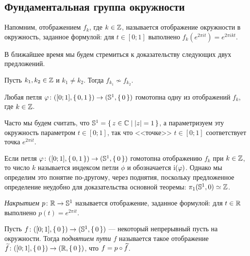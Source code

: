 \documentclass[main]{subfiles}
\begin{document}
\subsection{Фундаментальная группа окружности}

\begin{remark}
	Напомним, отображением $ f_k $, где $ k \in \mathbb{Z} $, называется отображение окружности в окружность, заданное
	формулой: для $ t \in [0; 1] $ выполнено $ f_k( e^{2 \pi i t}) = e^{2 \pi i k t} $.
\end{remark}

В ближайшее время мы будем стремиться к доказательству следующих двух предложений.

\begin{proposition*}
	Пусть $ k_1, k_2 \in \mathbb{Z} $ и $ k_1 \neq k_2 $. Тогда $ f_{k_1} \not \sim f_{k_2} $.
\end{proposition*}

\begin{proposition*}
	Любая петля $ \varphi \colon ([0; 1], \left\{\,0, 1\,\right\}) \to (\mathbb{S}^1, \left\{\,0\,\right\})$ гомотопна одну из отображений $ f_k $, где
	$ k \in \mathbb{Z} $.
\end{proposition*}

\begin{remark}
	Часто мы будем считать, что $ \mathbb{S}^1 = \left\{\, z \in \mathbb{C} \mid \left\vert z\right\vert = 1 \,\right\} $, а параметризуем эту окружность
	параметром $ t \in [0; 1] $, так что <<точке>> $ t \in [0; 1] $ соответствует точка $ e^{2 \pi i t} $.
\end{remark}

\begin{remark}
	Если петля $ \varphi \colon ([0; 1], \left\{\,0, 1\,\right\}) \to (\mathbb{S}^1, \left\{\,0\,\right\})$ гомотопна отображению $ f_k $ при $ k \in \mathbb{Z} $,
	то число $ k $ называется индексом петли $ \phi $ и обозначается $ \operatorname{i}(\varphi) $. Однако мы определим это понятие
	по-другому, через поднятия, поскольку предложенное определение неудобно для доказательства основной теоремы:
	$ \pi_1(\mathbb{S}^1, 0) \simeq \mathbb{Z} $.
\end{remark}

\begin{definition}
	\emph{Накрытием $ p \colon \mathbb{R} \to \mathbb{S}^1 $} называется отображение, заданное формулой: для $ t \in \mathbb{R} $ выполнено
	$ p(t) = e^{2 \pi i t} $.
\end{definition}

\begin{definition}
	Пусть $ f \colon ([0; 1], \left\{\,0\,\right\}) \to (\mathbb{S}^1, \left\{\,0\,\right\}) $ --- некоторый непрерывный пусть на окружности.
	Тогда \emph{поднятием пути $ f $} называется такое отображение $ \widetilde{f} \colon ([0; 1], \left\{\,0\,\right\}) \to (\mathbb{R}, \left\{\,0\,\right\}) $,
	что $ f = p \circ \widetilde{f} $.
\end{definition}
\end{document}
